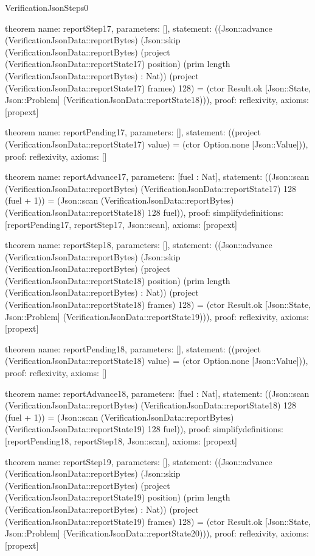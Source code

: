\begin{lexlean}{VerificationJsonSteps0}
\begin{semanticmodule}
theorem{
  name: reportStep17,
  parameters: [],
  statement: ((Json::advance (VerificationJsonData::reportBytes) (Json::skip (VerificationJsonData::reportBytes) (project (VerificationJsonData::reportState17) position) (prim length (VerificationJsonData::reportBytes) : Nat)) (project (VerificationJsonData::reportState17) frames) 128) = (ctor Result.ok [Json::State, Json::Problem] (VerificationJsonData::reportState18))),
  proof: reflexivity{},
  axioms: [propext]
}

theorem{
  name: reportPending17,
  parameters: [],
  statement: ((project (VerificationJsonData::reportState17) value) = (ctor Option.none [Json::Value])),
  proof: reflexivity{},
  axioms: []
}

theorem{
  name: reportAdvance17,
  parameters: [fuel : Nat],
  statement: ((Json::scan (VerificationJsonData::reportBytes) (VerificationJsonData::reportState17) 128 (fuel + 1)) = (Json::scan (VerificationJsonData::reportBytes) (VerificationJsonData::reportState18) 128 fuel)),
  proof: simplify{definitions: [reportPending17, reportStep17, Json::scan]},
  axioms: [propext]
}

theorem{
  name: reportStep18,
  parameters: [],
  statement: ((Json::advance (VerificationJsonData::reportBytes) (Json::skip (VerificationJsonData::reportBytes) (project (VerificationJsonData::reportState18) position) (prim length (VerificationJsonData::reportBytes) : Nat)) (project (VerificationJsonData::reportState18) frames) 128) = (ctor Result.ok [Json::State, Json::Problem] (VerificationJsonData::reportState19))),
  proof: reflexivity{},
  axioms: [propext]
}

theorem{
  name: reportPending18,
  parameters: [],
  statement: ((project (VerificationJsonData::reportState18) value) = (ctor Option.none [Json::Value])),
  proof: reflexivity{},
  axioms: []
}

theorem{
  name: reportAdvance18,
  parameters: [fuel : Nat],
  statement: ((Json::scan (VerificationJsonData::reportBytes) (VerificationJsonData::reportState18) 128 (fuel + 1)) = (Json::scan (VerificationJsonData::reportBytes) (VerificationJsonData::reportState19) 128 fuel)),
  proof: simplify{definitions: [reportPending18, reportStep18, Json::scan]},
  axioms: [propext]
}

theorem{
  name: reportStep19,
  parameters: [],
  statement: ((Json::advance (VerificationJsonData::reportBytes) (Json::skip (VerificationJsonData::reportBytes) (project (VerificationJsonData::reportState19) position) (prim length (VerificationJsonData::reportBytes) : Nat)) (project (VerificationJsonData::reportState19) frames) 128) = (ctor Result.ok [Json::State, Json::Problem] (VerificationJsonData::reportState20))),
  proof: reflexivity{},
  axioms: [propext]
}


\end{semanticmodule}
\end{lexlean}
